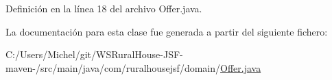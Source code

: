 Definición en la línea 18 del archivo Offer.\+java.



La documentación para esta clase fue generada a partir del siguiente fichero\+:\begin{DoxyCompactItemize}
\item 
C\+:/\+Users/\+Michel/git/\+W\+S\+Rural\+House-\/\+J\+S\+F-\/maven-\//src/main/java/com/ruralhousejsf/domain/\mbox{\hyperlink{_offer_8java}{Offer.\+java}}\end{DoxyCompactItemize}

